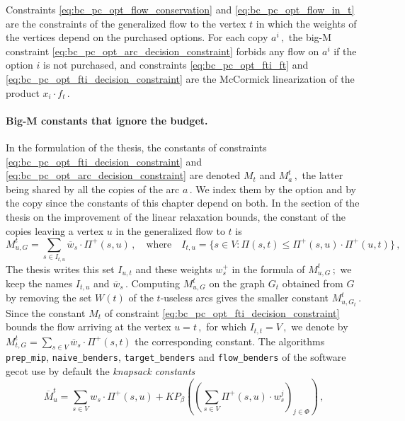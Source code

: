 \documentclass[11pt,a4paper]{report}
\theoremstyle{definition}
\theoremstyle{remark}
\begin{document}
Constraints \eqref{eq:bc_pc_opt_flow_conservation} and \eqref{eq:bc_pc_opt_flow_in_t} are the constraints of the generalized flow to the vertex $t$ in which the weights of the vertices depend on the purchased options. For each copy $a^i\,,$ the big-M constraint \eqref{eq:bc_pc_opt_arc_decision_constraint} forbids any flow on $a^i$ if the option $i$ is not purchased, and constraints \eqref{eq:bc_pc_opt_fti_ft} and \eqref{eq:bc_pc_opt_fti_decision_constraint} are the McCormick linearization \cite{LINEARISATION_MCCORMICK_1976} of the product $x_i \cdot f_t\,.$

\noindent
\paragraph{Big-M constants that ignore the budget.}
In the formulation of the thesis, the constants of constraints \eqref{eq:bc_pc_opt_fti_decision_constraint} and \eqref{eq:bc_pc_opt_arc_decision_constraint} are denoted $M_t$ and $M^t_a\,,$ the latter being shared by all the copies of the arc $a\,.$ We index them by the option and by the copy since the constants of this chapter depend on both. In the section of the thesis on the improvement of the linear relaxation bounds, the constant of the copies leaving a vertex $u$ in the generalized flow to $t$ is
\begin{equation}\label{eq:big_m_thesis}
  M^t_{u,G} = \sum_{s \in I_{t,u}} \overline{w}_s \cdot \Pi^+(s,u)\,, \quad \text{where} \quad I_{t,u} = \{s \in V : \Pi(s,t) \leq \Pi^+(s,u) \cdot \Pi^+(u,t)\}\,,
\end{equation}
The thesis writes this set $I_{u,t}$ and these weights $w^+_s$ in the formula of $M^t_{u,G}\,;$ we keep the names $I_{t,u}$ and $\overline{w}_s\,.$ Computing $M^t_{u,G}$ on the graph $G_t$ obtained from $G$ by removing the set $W(t)$ of the $t$-useless arcs gives the smaller constant $M^t_{u,G_t}\,.$ Since the constant $M_t$ of constraint \eqref{eq:bc_pc_opt_fti_decision_constraint} bounds the flow arriving at the vertex $u = t\,,$ for which $I_{t,t} = V\,,$ we denote by $M^t_{t,G} = \sum_{s \in V} \overline{w}_s \cdot \Pi^+(s,t)$ the corresponding constant. The algorithms \texttt{prep\_mip}, \texttt{naive\_benders}, \texttt{target\_benders} and \texttt{flow\_benders} of the software gecot use by default the \textit{knapsack constants}
\begin{equation}\label{eq:big_m_knapsack}
  \overline{M}^t_u = \sum_{s \in V} w_s \cdot \Pi^+(s,u) + KP_\beta\left(\left(\sum_{s \in V} \Pi^+(s,u) \cdot w^j_s\right)_{j \in \Phi}\right)\,,
\end{equation}
\end{document}
